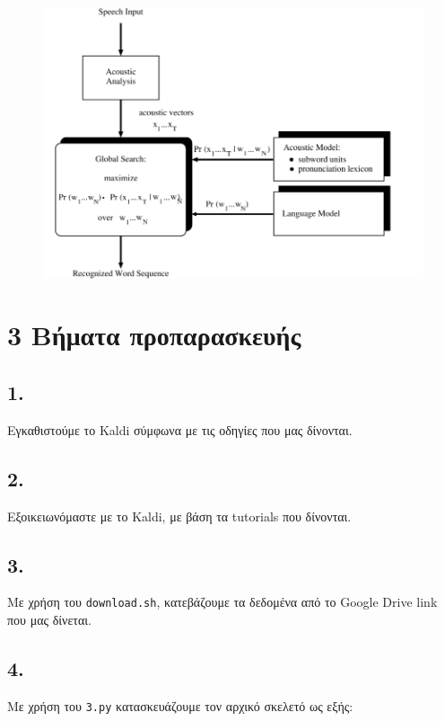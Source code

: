 \documentclass[a4paper, 12pt]{article}
\begin{document}
        \begin{figure}[H]
            \begin{center}
                \includegraphics[width=\linewidth]{hmm.png}
            \end{center}
        \end{figure}

\section*{3 Βήματα προπαρασκευής}
    
    \subsection*{1.}
        Εγκαθιστούμε το Kaldi σύμφωνα με τις οδηγίες που μας δίνονται.
        
    \subsection*{2.}
        Εξοικειωνόμαστε με το Kaldi, με βάση τα tutorials που δίνονται.
    
    \subsection*{3.}
        Με χρήση του \verb|download.sh|, κατεβάζουμε τα δεδομένα από το Google Drive link που μας δίνεται.
    
    \subsection*{4.}
        Με χρήση του \verb|3.py| κατασκευάζουμε τον αρχικό σκελετό ως εξής:
        
\end{document}
